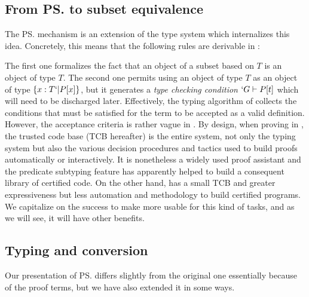 \documentclass{llncs}
\begin{document}
\subsection{From \ps{} to subset equivalence}
The \ps{} mechanism \cite{Rushby98:TSE,Shankar&Owre:WADT99}
is an extension of the \PVS type system which internalizes this idea.
Concretely, this means that the following rules are derivable in \PVS:
\begin{center}
  \DP
  \DP
\end{center}

The first one formalizes the fact that an object of a subset based on
$T$ is an object of type $T$. The second one permits using an object of
type $T$ as an object of type $\{ x : T `| P[x] \}$, but it generates a
\emph{type checking condition} $`G \vdash P[t]$ which will need to be
discharged later. Effectively, the typing algorithm of \PVS{} collects
the conditions that must be satisfied for the term to be accepted as a
valid definition. However, the acceptance criteria is rather vague in
\PVS{}. By design, when proving in \PVS{}, the trusted code base (TCB
hereafter) is the entire system, not only the typing system but also the
various decision procedures and tactics used to build proofs
automatically or interactively. It is nonetheless a widely used proof
assistant and the predicate subtyping feature has apparently helped to
build a consequent library of certified code. On the other hand, \Coq
has a small TCB and greater expressiveness but less automation and
methodology to build certified programs. We capitalize on the \PVS
success to make \Coq more usable for this kind of tasks, and as we will see,
it will have other benefits.

\subsection{Typing and conversion}
Our presentation of \ps{} differs slightly from the original one
essentially because of the proof terms, but we have also extended it in some ways. 
\end{document}
